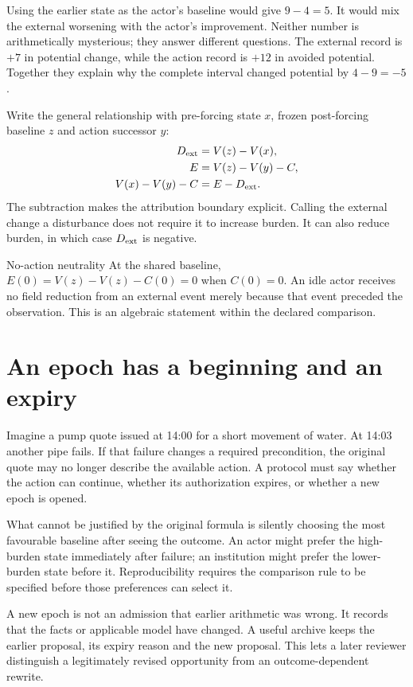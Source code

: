 Using the earlier state as the actor's baseline would give $9-4=5$. It would mix the external worsening with the actor's improvement. Neither number is arithmetically mysterious; they answer different questions. The external record is $+7$ in potential change, while the action record is $+12$ in avoided potential. Together they explain why the complete interval changed potential by $4-9=-5$.

Write the general relationship with pre-forcing state $x$, frozen post-forcing baseline $z$ and action successor $y$:
\begin{align}
 D_{\rm ext}&=V(z)-V(x),\\
 E&=V(z)-V(y)-C,\\
 V(x)-V(y)-C&=E-D_{\rm ext}.
\end{align}
The subtraction makes the attribution boundary explicit. Calling the external change a disturbance does not require it to increase burden. It can also reduce burden, in which case $D_{\rm ext}$ is negative.

\begin{lawbox}{No-action neutrality}
At the shared baseline, $E(0)=V(z)-V(z)-C(0)=0$ when $C(0)=0$. An idle actor receives no field reduction from an external event merely because that event preceded the observation. This is an algebraic statement within the declared comparison.
\end{lawbox}

\section{An epoch has a beginning and an expiry}
Imagine a pump quote issued at 14:00 for a short movement of water. At 14:03 another pipe fails. If that failure changes a required precondition, the original quote may no longer describe the available action. A protocol must say whether the action can continue, whether its authorization expires, or whether a new epoch is opened.

What cannot be justified by the original formula is silently choosing the most favourable baseline after seeing the outcome. An actor might prefer the high-burden state immediately after failure; an institution might prefer the lower-burden state before it. Reproducibility requires the comparison rule to be specified before those preferences can select it.

A new epoch is not an admission that earlier arithmetic was wrong. It records that the facts or applicable model have changed. A useful archive keeps the earlier proposal, its expiry reason and the new proposal. This lets a later reviewer distinguish a legitimately revised opportunity from an outcome-dependent rewrite.

